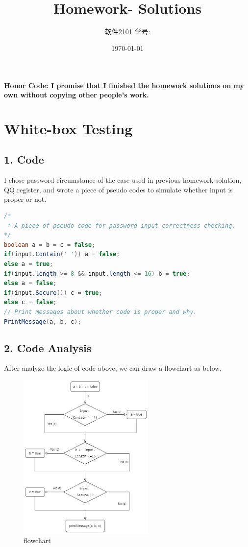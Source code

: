 \documentclass[11pt, oneside]{article}  %
\title{\vspace{-4cm}\CourseCodeName \space
        \Session \protect\\  Homework-\textbf{\Homework} Solutions}
\author{软件2101 \Name \space 学号: \SID}
\date{\today}
\begin{document}
\maketitle

\textbf{Honor Code: I promise that I finished the homework solutions on my own without copying other people's work.}

\section*{White-box Testing}

\subsection*{1. Code}

I chose password circumstance of the case used in previous homework solution, QQ register, and wrote a piece of pseudo codes to 
simulate whether input is proper or not.

\begin{lstlisting}[language = Java, 
    caption = {pseudo code for password style check}
    ]
/*
 * A piece of pseudo code for password input correctness checking.
*/
boolean a = b = c = false;
if(input.Contain(' ')) a = false;
else a = true;
if(input.length >= 8 && input.length <= 16) b = true;
else a = false;
if(input.Secure()) c = true;
else c = false;
// Print messages about whether code is proper and why.
PrintMessage(a, b, c);                  
\end{lstlisting}

\subsection*{2. Code Analysis}

After analyze the logic of code above, we can draw a flowchart as below.

\begin{figure}[H]
    \centering
    \includegraphics[width = 0.6\textwidth]{./pic/flowchart.jpg}
    \caption{flowchart}
\end{figure}
\end{document}
